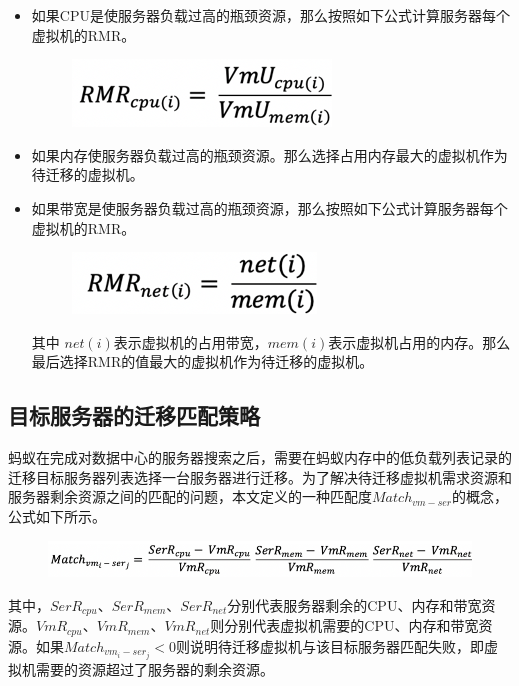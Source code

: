 \begin{itemize}
 \item 如果CPU是使服务器负载过高的瓶颈资源，那么按照如下公式计算服务器每个虚拟机的RMR。

        \begin{figure}[!htb]
          \centering
          \includegraphics{./Figure/IMG_Chap3_12.png}
        \end{figure}

 \item 如果内存使服务器负载过高的瓶颈资源。那么选择占用内存最大的虚拟机作为待迁移的虚拟机。
 \item 如果带宽是使服务器负载过高的瓶颈资源，那么按照如下公式计算服务器每个虚拟机的RMR。

        \begin{figure}[!htb]
          \centering
          \includegraphics{./Figure/IMG_Chap3_13.png}
        \end{figure}

        其中 $ net(i) $表示虚拟机的占用带宽，$ mem(i) $表示虚拟机占用的内存。那么最后选择RMR的值最大的虚拟机作为待迁移的虚拟机。
 \end{itemize}

\subsection{目标服务器的迁移匹配策略}
蚂蚁在完成对数据中心的服务器搜索之后，需要在蚂蚁内存中的低负载列表记录的迁移目标服务器列表选择一台服务器进行迁移。为了解决待迁移虚拟机需求资源和服务器剩余资源之间的匹配的问题，本文定义的一种匹配度$ Match_{vm-ser} $的概念，公式如下所示。

\begin{figure}[htp]
  \centering
  \includegraphics{./Figure/IMG_Chap3_14.png}
\end{figure}

其中，$ SerR_{cpu} $、$ SerR_{mem} $、$ SerR_{net} $分别代表服务器剩余的CPU、内存和带宽资源。$ VmR_{cpu} $、$ VmR_{mem} $、$ VmR_{net} $则分别代表虚拟机需要的CPU、内存和带宽资源。如果$ Match_{vm_i-ser_j} < 0 $则说明待迁移虚拟机与该目标服务器匹配失败，即虚拟机需要的资源超过了服务器的剩余资源。

